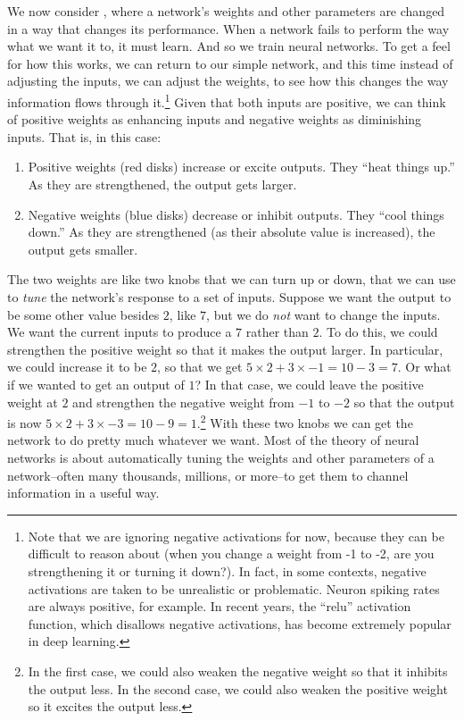 We now consider , where a network's weights and other parameters are changed in a way that changes its performance. When a network fails to perform the way what we want it to, it must learn. And so we train neural networks. To get a feel for how this works, we can return to our simple network, and this time instead of adjusting the inputs, we can adjust the weights, to see how this changes the way information flows through it.\footnote{Note that we are ignoring negative activations for now, because they can be difficult to reason about (when you change a weight from -1 to -2, are you strengthening it or turning it down?). In fact, in some contexts, negative activations are taken to be unrealistic or problematic. Neuron spiking rates are always positive, for example. In recent years, the ``relu'' activation function, which disallows negative activations, has become extremely popular in deep learning.} Given that both inputs are positive, we can think of positive weights as enhancing inputs and negative weights as diminishing inputs. That is, in this case:
\begin{enumerate}
\item  Positive weights (red disks) increase or excite outputs. They ``heat things up.'' As they are strengthened, the output gets larger.
\item  Negative weights (blue disks) decrease or inhibit outputs. They ``cool things down.'' As they are strengthened (as their absolute value is increased), the output gets smaller.
\end{enumerate}
The two weights are like two knobs that we can turn up or down, that we can use to \emph{tune} the network's response to a set of inputs. Suppose we want the output to be some other value besides $2$, like $7$, but we do \emph{not} want to change the inputs. We want the current inputs to produce a $7$ rather than $2$. To do this, we could strengthen the positive weight so that it makes the output larger. In particular, we could increase it to be $2$, so that we get $5 \times 2 + 3 \times -1 = 10 - 3 = 7$.  Or what if we wanted to get an output of $1$? In that case, we could leave the positive weight at $2$ and strengthen the negative weight from $-1$ to $-2$ so that the output is now $5 \times 2 + 3 \times -3 = 10 - 9 = 1$.\footnote{In the first case, we could also weaken the negative weight so that it inhibits the output less. In the second case, we could also weaken the positive weight so it excites the output less.} With these two knobs we can get the network to do pretty much whatever we want. Most of the theory of neural networks is about automatically tuning the weights and other parameters of a network--often many thousands, millions, or more--to get them to channel information in a useful way.

